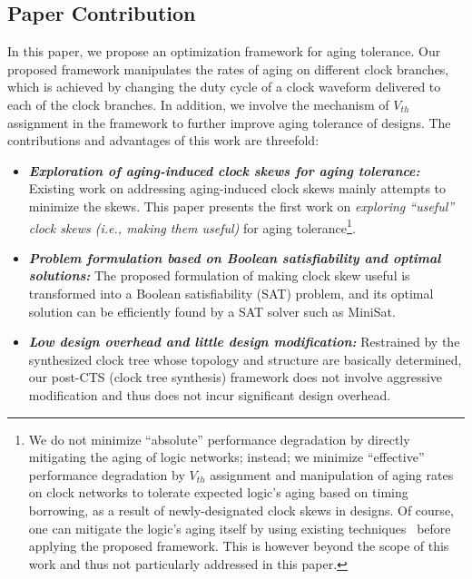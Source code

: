 \subsection{Paper Contribution}
\label{subsec:pc}
In this paper, we propose an optimization framework for aging tolerance. Our proposed framework manipulates the rates of aging on different clock branches, which is achieved by changing the duty cycle of a clock waveform delivered to each of the clock branches. In addition, we involve the mechanism of $V_{th}$ assignment in the framework to further improve aging tolerance of designs. The contributions and advantages of this work are threefold:




\begin{itemize}
\item \textbf{\textit{Exploration of aging-induced clock skews for aging tolerance:}} Existing work on addressing aging-induced clock skews mainly attempts to minimize the skews. This paper presents the first work on \textit{exploring \enquote{useful} clock skews (i.e., making them useful)} for aging tolerance\footnote[1]{We do not minimize \enquote{absolute} performance degradation by directly mitigating the aging of logic networks; instead; we minimize \enquote{effective} performance degradation by $V_{th}$ assignment and manipulation of aging rates on clock networks to tolerate expected logic's aging based on timing borrowing, as a result of newly-designated clock skews in designs. Of course, one can mitigate the logic's aging itself by using existing techniques~\cite{kumar2007nbti, paul2006temporal, kang2007efficient, yang2007combating} before applying the proposed framework. This is however beyond the scope of this work and thus not particularly addressed in this paper.}.
\item  \textbf{\textit{Problem formulation based on Boolean satisfiability and optimal solutions:}} The proposed formulation of making clock skew useful is transformed into a Boolean satisfiability (SAT) problem, and its optimal solution can be efficiently found by a SAT solver such as MiniSat.
\item \textbf{\textit{Low design overhead and little design modification:}} Restrained by the synthesized clock tree whose topology and structure are basically determined, our post-CTS (clock tree synthesis) framework does not involve aggressive modification and thus does not incur significant design overhead.
\end{itemize}



